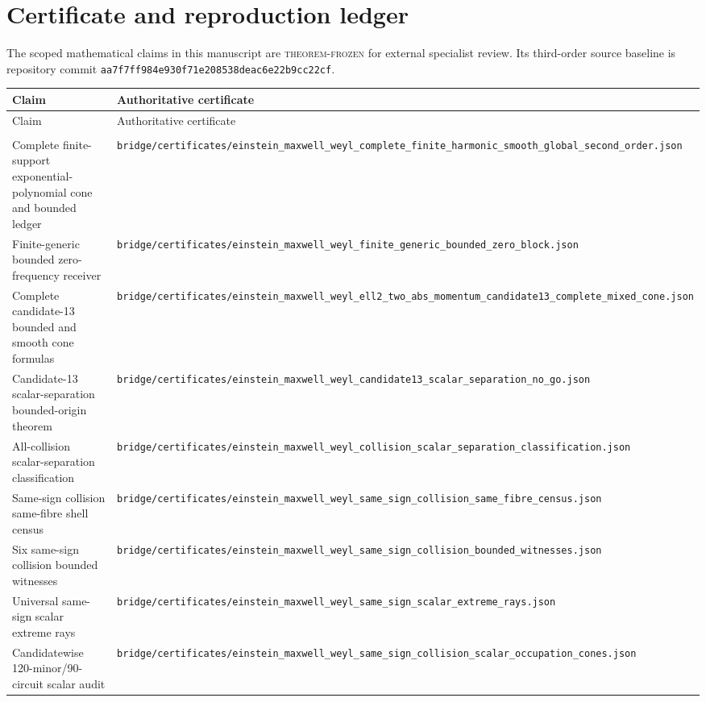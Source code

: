 \documentclass[11pt]{article}
\theoremstyle{definition}
\theoremstyle{remark}
\newcommand{\cert}[1]{\nolinkurl{#1}}
\begin{document}
\section{Certificate and reproduction ledger}

The scoped mathematical claims in this manuscript are
\textsc{theorem-frozen} for external specialist review.  Its third-order
source baseline is repository commit
\nolinkurl{aa7f7ff984e930f71e208538deac6e22b9cc22cf}.

\begingroup
\small
\begin{longtable}{@{}>{\raggedright\arraybackslash}p{} >{\raggedright\arraybackslash}p{}@{}}
\toprule
Claim & Authoritative certificate\\
\midrule
\endfirsthead
\toprule
Claim & Authoritative certificate\\
\midrule
\endhead
\midrule
\multicolumn{2}{r}{\small Continued on next page}\\
\endfoot
\bottomrule
\endlastfoot
Complete finite-support exponential-polynomial cone and bounded ledger &
\cert{bridge/certificates/einstein_maxwell_weyl_complete_finite_harmonic_smooth_global_second_order.json}\\
Finite-generic bounded zero-frequency receiver &
\cert{bridge/certificates/einstein_maxwell_weyl_finite_generic_bounded_zero_block.json}\\
Complete candidate-13 bounded and smooth cone formulas &
\cert{bridge/certificates/einstein_maxwell_weyl_ell2_two_abs_momentum_candidate13_complete_mixed_cone.json}\\
Candidate-13 scalar-separation bounded-origin theorem &
\cert{bridge/certificates/einstein_maxwell_weyl_candidate13_scalar_separation_no_go.json}\\
All-collision scalar-separation classification &
\cert{bridge/certificates/einstein_maxwell_weyl_collision_scalar_separation_classification.json}\\
Same-sign collision same-fibre shell census &
\cert{bridge/certificates/einstein_maxwell_weyl_same_sign_collision_same_fibre_census.json}\\
Six same-sign collision bounded witnesses &
\cert{bridge/certificates/einstein_maxwell_weyl_same_sign_collision_bounded_witnesses.json}\\
Universal same-sign scalar extreme rays &
\cert{bridge/certificates/einstein_maxwell_weyl_same_sign_scalar_extreme_rays.json}\\
Candidatewise 120-minor/90-circuit scalar audit &
\cert{bridge/certificates/einstein_maxwell_weyl_same_sign_collision_scalar_occupation_cones.json}\\

\end{longtable}
\end{document}
